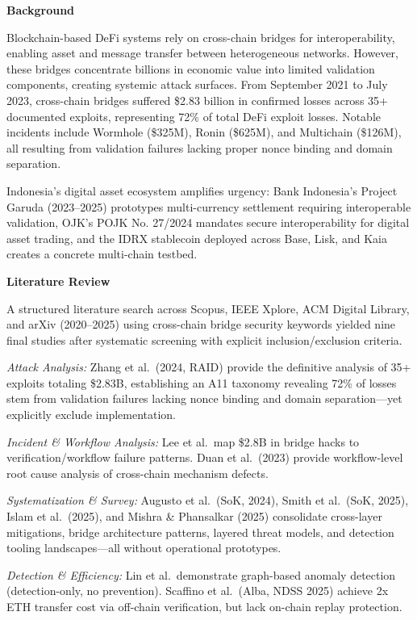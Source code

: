 \documentclass[
]{article}
\begin{document}
\textbf{Background}

Blockchain-based DeFi systems rely on cross-chain bridges for interoperability, enabling asset and message transfer between heterogeneous networks. However, these bridges concentrate billions in economic value into limited validation components, creating systemic attack surfaces. From September 2021 to July 2023, cross-chain bridges suffered \$2.83 billion in confirmed losses across 35+ documented exploits, representing 72\% of total DeFi exploit losses. Notable incidents include Wormhole (\$325M), Ronin (\$625M), and Multichain (\$126M), all resulting from validation failures lacking proper nonce binding and domain separation.

Indonesia's digital asset ecosystem amplifies urgency: Bank Indonesia's Project Garuda (2023--2025) prototypes multi-currency settlement requiring interoperable validation, OJK's POJK No. 27/2024 mandates secure interoperability for digital asset trading, and the IDRX stablecoin deployed across Base, Lisk, and Kaia creates a concrete multi-chain testbed.

\textbf{Literature Review}

A structured literature search across Scopus, IEEE Xplore, ACM Digital Library, and arXiv (2020--2025) using cross-chain bridge security keywords yielded nine final studies after systematic screening with explicit inclusion/exclusion criteria.

\textit{Attack Analysis:} Zhang et al.\ (2024, RAID) provide the definitive analysis of 35+ exploits totaling \$2.83B, establishing an A11 taxonomy revealing 72\% of losses stem from validation failures lacking nonce binding and domain separation---yet explicitly exclude implementation.

\textit{Incident \& Workflow Analysis:} Lee et al.\ map \$2.8B in bridge hacks to verification/workflow failure patterns. Duan et al.\ (2023) provide workflow-level root cause analysis of cross-chain mechanism defects.

\textit{Systematization \& Survey:} Augusto et al.\ (SoK, 2024), Smith et al.\ (SoK, 2025), Islam et al.\ (2025), and Mishra \& Phansalkar (2025) consolidate cross-layer mitigations, bridge architecture patterns, layered threat models, and detection tooling landscapes---all without operational prototypes.

\textit{Detection \& Efficiency:} Lin et al.\ demonstrate graph-based anomaly detection (detection-only, no prevention). Scaffino et al.\ (Alba, NDSS 2025) achieve 2x ETH transfer cost via off-chain verification, but lack on-chain replay protection.
\end{document}
